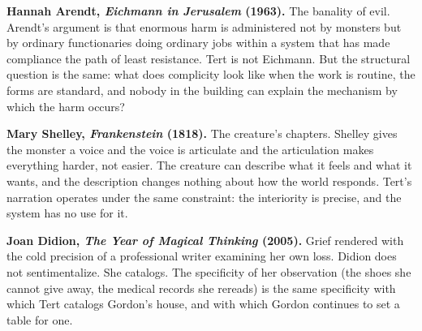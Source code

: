 \bigskip

\textbf{Hannah Arendt, \emph{Eichmann in Jerusalem} (1963).}
The banality of evil. Arendt's argument is that enormous harm is administered not by monsters but by ordinary functionaries doing ordinary jobs within a system that has made compliance the path of least resistance. Tert is not Eichmann. But the structural question is the same: what does complicity look like when the work is routine, the forms are standard, and nobody in the building can explain the mechanism by which the harm occurs?

\bigskip

\textbf{Mary Shelley, \emph{Frankenstein} (1818).}
The creature's chapters. Shelley gives the monster a voice and the voice is articulate and the articulation makes everything harder, not easier. The creature can describe what it feels and what it wants, and the description changes nothing about how the world responds. Tert's narration operates under the same constraint: the interiority is precise, and the system has no use for it.

\bigskip

\textbf{Joan Didion, \emph{The Year of Magical Thinking} (2005).}
Grief rendered with the cold precision of a professional writer examining her own loss. Didion does not sentimentalize. She catalogs. The specificity of her observation (the shoes she cannot give away, the medical records she rereads) is the same specificity with which Tert catalogs Gordon's house, and with which Gordon continues to set a table for one.
